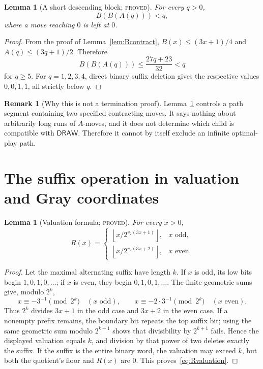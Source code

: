 \documentclass[11pt]{article}
\newtheorem{lemma}[theorem]{Lemma}
\theoremstyle{definition}
\newtheorem{remark}[theorem]{Remark}
\newcommand{\Draw}{\mathsf{DRAW}}
\newcommand{\vTwo}{v_2}
\newcommand{\proved}{\textsc{proved}}
\begin{document}
\begin{lemma}[A short descending block; \proved]\label{lem:BBA}
For every $q>0$,
\[
 B(B(A(q)))<q,
\]
where a move reaching $0$ is left at $0$.
\end{lemma}

\begin{proof}
From the proof of Lemma~\ref{lem:Bcontract},
$B(x)\le(3x+1)/4$ and $A(q)\le(3q+1)/2$.  Therefore
\[
 B(B(A(q)))\le \frac{27q+23}{32}<q
\]
for $q\ge5$.  For $q=1,2,3,4$, direct binary suffix deletion gives the
respective values $0,0,1,1$, all strictly below $q$.
\end{proof}

\begin{remark}[Why this is not a termination proof]
Lemma~\ref{lem:BBA} controls a path segment containing two specified
contracting moves.  It says nothing about arbitrarily long runs of $A$-moves,
and it does not determine which child is compatible with $\Draw$.  Therefore
it cannot by itself exclude an infinite optimal-play path.
\end{remark}

\section{The suffix operation in valuation and Gray coordinates}

\begin{lemma}[Valuation formula; \proved]\label{lem:Rvaluation}
For every $x>0$,
\begin{equation}\label{eq:Rvaluation}
 R(x)=
 \begin{cases}
 \left\lfloor x/2^{\vTwo(3x+1)}\right\rfloor,&x\text{ odd},\\[2mm]
 \left\lfloor x/2^{\vTwo(3x+2)}\right\rfloor,&x\text{ even}.
 \end{cases}
\end{equation}
\end{lemma}

\begin{proof}
Let the maximal alternating suffix have length $k$.  If $x$ is odd, its low
bits begin $1,0,1,0,\ldots$; if $x$ is even, they begin
$0,1,0,1,\ldots$.  The finite geometric sums give, modulo $2^k$,
\[
 x\equiv -3^{-1}\pmod{2^k}\quad(x\text{ odd}),
 \qquad
 x\equiv -2\cdot3^{-1}\pmod{2^k}\quad(x\text{ even}).
\]
Thus $2^k$ divides $3x+1$ in the odd case and $3x+2$ in the even case.  If a
nonempty prefix remains, the boundary bit repeats the top suffix bit; using
the same geometric sum modulo $2^{k+1}$ shows that divisibility by
$2^{k+1}$ fails.  Hence the displayed valuation equals $k$, and division by
that power of two deletes exactly the suffix.  If the suffix is the entire
binary word, the valuation may exceed $k$, but both the quotient's floor and
$R(x)$ are $0$.  This proves~\eqref{eq:Rvaluation}.
\end{proof}
\end{document}

